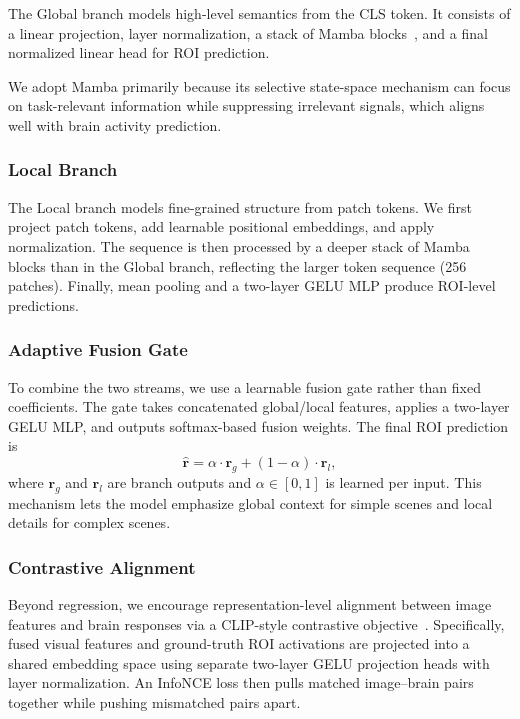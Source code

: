 The Global branch models high-level semantics from the CLS token. It consists of a linear projection, layer normalization, a stack of Mamba blocks~\cite{mamba2}, and a final normalized linear head for ROI prediction.

We adopt Mamba primarily because its selective state-space mechanism can focus on task-relevant information while suppressing irrelevant signals, which aligns well with brain activity prediction.

\subsubsection{Local Branch}

The Local branch models fine-grained structure from patch tokens. We first project patch tokens, add learnable positional embeddings, and apply normalization. The sequence is then processed by a deeper stack of Mamba blocks than in the Global branch, reflecting the larger token sequence (256 patches). Finally, mean pooling and a two-layer GELU MLP produce ROI-level predictions.

\subsubsection{Adaptive Fusion Gate}

To combine the two streams, we use a learnable fusion gate rather than fixed coefficients. The gate takes concatenated global/local features, applies a two-layer GELU MLP, and outputs softmax-based fusion weights. The final ROI prediction is
\begin{equation}
  \hat{\mathbf{r}} = \alpha \cdot \mathbf{r}_{g} + (1 - \alpha) \cdot \mathbf{r}_{l},
\end{equation}
where $\mathbf{r}_{g}$ and $\mathbf{r}_{l}$ are branch outputs and $\alpha \in [0,1]$ is learned per input. This mechanism lets the model emphasize global context for simple scenes and local details for complex scenes.

\subsubsection{Contrastive Alignment}

Beyond regression, we encourage representation-level alignment between image features and brain responses via a CLIP-style contrastive objective~\cite{pmlr-v139-radford21a}. Specifically, fused visual features and ground-truth ROI activations are projected into a shared embedding space using separate two-layer GELU projection heads with layer normalization. An InfoNCE loss then pulls matched image--brain pairs together while pushing mismatched pairs apart.

